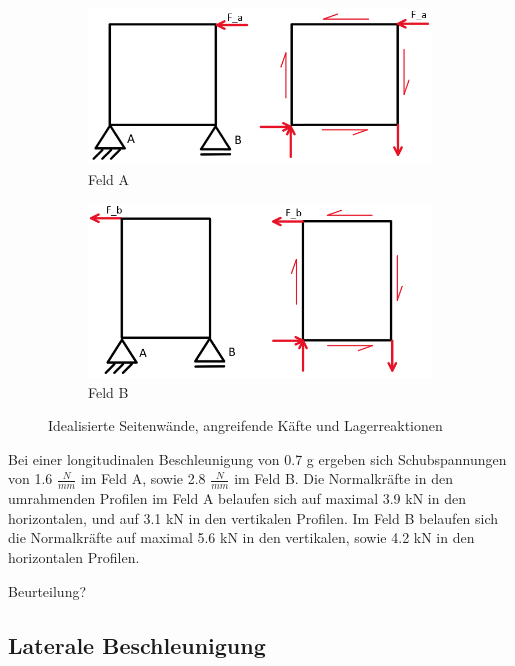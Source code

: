   \begin{figure}[!ht]
    \centering
      \begin{subfigure}[b]{0.5\textwidth}
         \includegraphics[width=1\linewidth]{04_Figures/1.2 Feld A}
         \caption{Feld A}
         \label{Feld A}
      \end{subfigure}
      \begin{subfigure}[b]{0.5\textwidth}
         \includegraphics[width=1\linewidth]{04_Figures/1.2 Feld B}
         \caption{Feld B}
         \label{Feld B}
      \end{subfigure}
    \caption{Idealisierte Seitenwände, angreifende Käfte und Lagerreaktionen}
    \label{1.2 Felder}
  \end{figure}

  Bei einer longitudinalen Beschleunigung von 0.7 g ergeben sich Schubspannungen von 1.6 $\frac{N}{mm}$ im Feld A, sowie 2.8 $\frac{N}{mm}$ im Feld B. Die Normalkräfte in den umrahmenden Profilen im Feld A belaufen sich auf maximal 3.9 kN in den horizontalen, und auf 3.1 kN in den vertikalen Profilen. Im Feld B belaufen sich die Normalkräfte auf maximal 5.6 kN in den vertikalen, sowie 4.2 kN in den horizontalen Profilen.

  Beurteilung?

\subsection{Laterale Beschleunigung}
\label{1.4 Laterale Beschleunigung}
